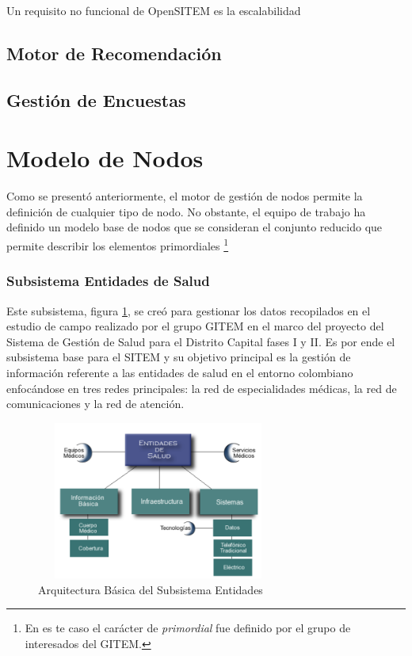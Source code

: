 Un requisito no funcional de OpenSITEM es la escalabilidad


\subsection{Motor de Recomendación}


\subsection{Gestión de Encuestas}






\section{Modelo de Nodos}

Como se presentó anteriormente, el motor de gestión de nodos permite la definición de cualquier tipo de nodo. No obstante, el equipo de trabajo ha definido un modelo base de nodos que se consideran el conjunto reducido que permite describir los elementos primordiales \footnote{En es te caso el carácter de \textit{primordial} fue definido por el grupo de interesados del GITEM.}

















\subsubsection{Subsistema Entidades de Salud} 
Este subsistema, figura \ref{entidades}, se creó para gestionar los datos recopilados en el estudio de campo realizado por el grupo GITEM en el marco del proyecto del Sistema de Gestión de Salud para el Distrito Capital fases I y II. Es por ende el subsistema base para el SITEM y su objetivo principal es la gestión de información referente a las entidades de salud en el entorno colombiano enfocándose en tres redes principales: la red de especialidades médicas, la red de comunicaciones y la red de atención.

\begin{figure}
 \centering
 \includegraphics[width=80mm, height=52mm]{entidades.png}
 \caption{Arquitectura Básica del Subsistema Entidades}
\label{entidades}
\end{figure}

